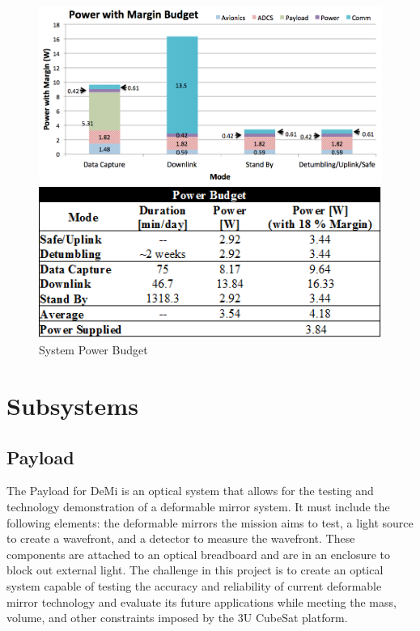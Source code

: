 \documentclass[12pt]{article}
\begin{document}
			\begin{figure}[!ht]
				\centering
				\includegraphics[width=5in]{images/MissionOverview_4.png}

				\includegraphics[width=5in]{images/MissionOverview_6.png}
				\caption{System Power Budget}
				\label{fig:Mission_power2}
			\end{figure}
\newpage			
\section{Subsystems}

\FloatBarrier

		\subsection{Payload}
The Payload for DeMi is an optical system that allows for the testing
and technology demonstration of a deformable mirror system.  It must include the following  elements: the deformable mirrors the
mission aims to test, a light source to create a wavefront, and a detector to measure the wavefront.  These components are attached
to an optical breadboard and are in an enclosure to block out external
light.  The challenge in this project is to create an optical system capable of testing the accuracy and reliability of current deformable mirror technology and evaluate its future applications while meeting the mass, volume, and other constraints imposed by the 3U CubeSat platform.
			
\end{document}
